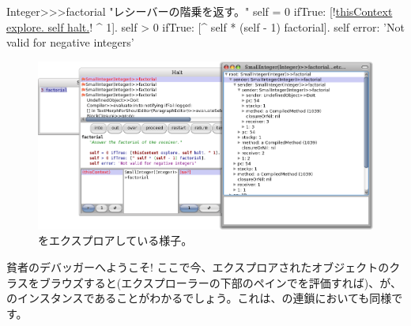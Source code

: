 \documentclass[a4paper,10pt,twoside]{book}
\begin{document}

\begin{code}{}
Integer>>>factorial
	"レシーバーの階乗を返す。"
	self = 0 ifTrue: [!\underline{thisContext explore. self halt.}! ^ 1].
	self > 0 ifTrue: [^ self * (self - 1) factorial].
	self error: 'Not valid for negative integers'
\end{code}


\begin{figure}[ht]\centering
	\includegraphics[width=\linewidth]{exploringThisContext}
	\caption{をエクスプロアしている様子。}
\end{figure}

貧者のデバッガーへようこそ!
ここで今、エクスプロアされたオブジェクトのクラスをブラウズすると(\ie エクスプローラーの下部のペインでを評価すれば)、が、のインスタンスであることがわかるでしょう。これは、の連鎖においても同様です。
\end{document}

